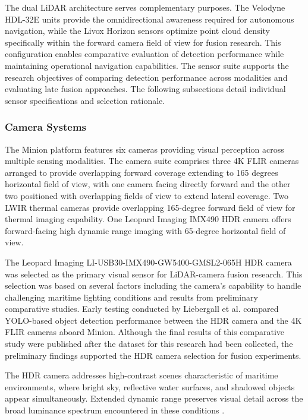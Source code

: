\documentclass{erauthesis}
\begin{document}
The dual \ac{LiDAR} architecture serves complementary purposes.
The Velodyne HDL-32E units provide the omnidirectional awareness required for autonomous navigation, while the Livox Horizon sensors optimize point cloud density specifically within the forward camera field of view for fusion research.
This configuration enables comparative evaluation of detection performance while maintaining operational navigation capabilities.
The sensor suite supports the research objectives of comparing detection performance across modalities and evaluating late fusion approaches.
The following subsections detail individual sensor specifications and selection rationale.

            \subsubsection{Camera Systems}

The Minion platform features six cameras providing visual perception across multiple sensing modalities.
The camera suite comprises three 4K FLIR cameras arranged to provide overlapping forward coverage extending to 165 degrees horizontal field of view, with one camera facing directly forward and the other two positioned with overlapping fields of view to extend lateral coverage.
Two \ac{LWIR} thermal cameras provide overlapping 165-degree forward field of view for thermal imaging capability.
One Leopard Imaging IMX490 \ac{HDR} camera offers forward-facing high dynamic range imaging with 65-degree horizontal field of view.

The Leopard Imaging LI-USB30-IMX490-GW5400-GMSL2-065H \ac{HDR} camera was selected as the primary visual sensor for \ac{LiDAR}-camera fusion research.
This selection was based on several factors including the camera's capability to handle challenging maritime lighting conditions and results from preliminary comparative studies.
Early testing conducted by Liebergall et al. \cite{liebergall} compared YOLO-based object detection performance between the \ac{HDR} camera and the 4K FLIR cameras aboard Minion.
Although the final results of this comparative study were published after the dataset for this research had been collected, the preliminary findings supported the \ac{HDR} camera selection for fusion experiments.

The \ac{HDR} camera addresses high-contrast scenes characteristic of maritime environments, where bright sky, reflective water surfaces, and shadowed objects appear simultaneously.
Extended dynamic range preserves visual detail across the broad luminance spectrum encountered in these conditions \cite{thompson2023}.
\end{document}
